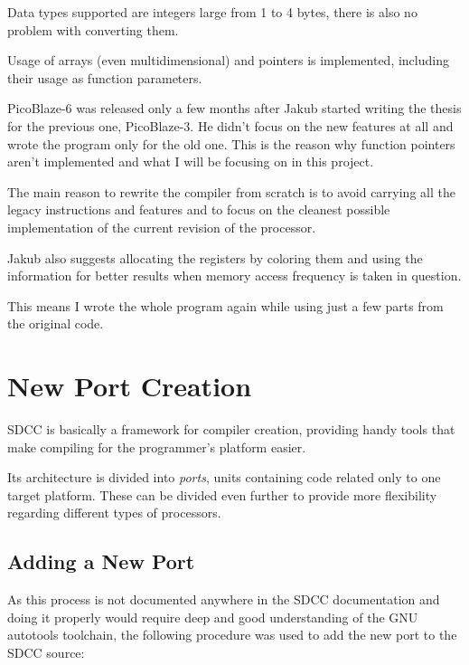     Data types supported are integers large from 1 to 4 bytes, there is also no problem with converting them.

    Usage of arrays (even multidimensional) and pointers is implemented, including their usage as function parameters.

    PicoBlaze-6 was released only a few months after Jakub started writing the thesis for the previous one, PicoBlaze-3. 
    He didn't focus on the new features at all and wrote the program only for the old one.
    This is the reason why function pointers aren't implemented and what I will be focusing on in this project.

    The main reason to rewrite the compiler from scratch is to avoid carrying all the legacy instructions and features and to focus on the cleanest possible implementation of the current revision of the processor.

    Jakub also suggests allocating the registers by coloring them and using the information for better results when memory access frequency is taken in question.

    This means I wrote the whole program again while using just a few parts from the original code.


\chapter{New Port Creation}\label{port}

SDCC is basically a framework for compiler creation, providing handy tools that make compiling for the programmer's platform easier.

Its architecture is divided into \emph{ports}, units containing code related only to one target platform. These can be divided even further to provide more flexibility regarding different types of processors.

    \section{Adding a New Port}

    As this process is not documented anywhere in the SDCC documentation and doing it properly would require deep and good understanding of the GNU autotools toolchain, the following procedure was used to add the new port to the SDCC source:

